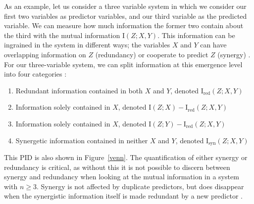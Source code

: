 \documentclass[../main.tex]{subfiles}
\begin{document}
As an example, let us consider a three variable system in which we consider our first two variables as predictor variables, and our third variable as the predicted variable.
We can measure how much information the former two contain about the third with the mutual information $\mathrm{I} \left( Z;X,Y \right)$.
This information can be ingrained in the system in different ways; the variables $X$ and $Y$ can have overlapping information on $Z$ (redundancy) or cooperate to predict $Z$ (synergy) \cite{griffith2014quantifying}.
For our three-variable system, we can split information at this emergence level into four categories \cite{williams2010nonnegative}:
%
\begin{enumerate}
\item Redundant information contained in both $X$ and $Y$, denoted $\mathrm{I}_\mathrm{red} \left( Z;X,Y \right)$
\item Information solely contained in $X$, denoted $\mathrm{I}\left(Z; X \right) - \mathrm{I}_\mathrm{red}(Z;X,Y)$
\item Information solely contained in $X$, denoted $\mathrm{I}\left(Z; Y \right) - \mathrm{I}_\mathrm{red}\left( Z;X,Y \right)$
\item Synergetic information contained in neither $X$ and $Y$, denoted $\mathrm{I}_\mathrm{syn}\left( Z;X,Y \right)$
\end{enumerate}
This PID is also shown in Figure~\ref{venn}.
The quantification of either synergy or redundancy is critical, as without this it is not possible to discern between synergy and redundancy when looking at the mutual information in a system with $n \ge 3$.
Synergy is not affected by duplicate predictors, but does disappear when the synergistic information itself is made redundant by a new predictor \cite{griffith2014quantifying}.

\def\firstcircle{(0:-0.9cm) circle (2cm)}
\def\secondcircle{(0:0cm) circle (3cm)}
\def\thirdcircle{(0:0.9cm) circle (2cm)}
\end{document}

